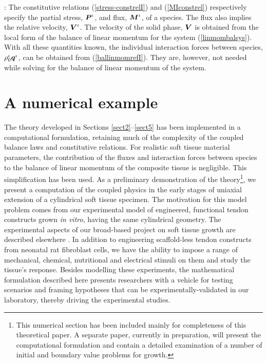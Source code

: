 : The constitutive relations
(\ref{stress-constrelI}) and (\ref{MIconstrel}) respectively
specify the partial stress, $\mbox{\boldmath$ P$}^\iota$, and flux, $\mbox{\boldmath$ M$}^\iota$, of
a species. The flux also implies the relative velocity,
$\mbox{\boldmath$ V$}^\iota$. The velocity of the solid phase, $\mbox{\boldmath$ V$}$ is obtained
from the local form of the balance of linear momentum for the
system (\ref{linmombalsys}). With all these quantities known, the
individual interaction forces between species,
$\rho^\iota_0\mbox{\boldmath$ q$}^\iota$, can be obtained from
(\ref{ballinmomrefI}). They are, however, not needed while solving
for the balance of linear momentum of the system.

\section{A numerical example} \label{sect6}

The theory developed in Sections \ref{sect2}--\ref{sect5} has been
implemented in a computational formulation, retaining much of the
complexity of the coupled balance laws and constitutive relations.
For realistic soft tissue material parameters, the contribution of
the fluxes and interaction forces between species to the balance
of linear momentum of the composite tissue is negligible. This
simplification has been used. As a preliminary demonstration of
the theory\footnote{This numerical section has been included
mainly for completeness of this theoretical paper. A separate
paper, currently in preparation, will present the computational
formulation and contain a detailed examination of a number of
initial and boundary value problems for growth.}, we present a
computation of the coupled physics in the early stages of uniaxial
extension of a cylindrical soft tissue specimen. The motivation
for this model problem comes from our experimental model of
engineered, functional tendon constructs grown \emph{in vitro},
having the same cylindrical geometry. The experimental aspects of
our broad-based project on soft tissue growth are described
elsewhere \citep{Calve:04}. In addition to engineering
scaffold-less tendon constructs from neonatal rat fibroblast
cells, we have the ability to impose a range of mechanical,
chemical, nutritional and electrical stimuli on them and study the
tissue's response. Besides modelling these experiments, the
mathematical formulation described here presents researchers with
a vehicle for testing scenarios and framing hypotheses that can be
experimentally-validated in our laboratory, thereby driving the
experimental studies.

